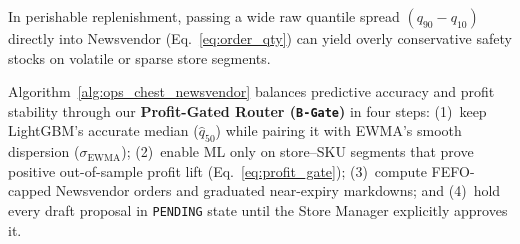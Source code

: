 In perishable replenishment, passing a wide raw quantile spread $(q_{90}-q_{10})$ directly into Newsvendor (Eq.~\ref{eq:order_qty}) can yield overly conservative safety stocks on volatile or sparse store segments.

Algorithm~\ref{alg:ops_chest_newsvendor} balances predictive accuracy and profit stability through our \textbf{Profit-Gated Router (\texttt{B-Gate})} in four steps: (1)~keep LightGBM's accurate median ($\hat{q}_{50}$) while pairing it with EWMA's smooth dispersion ($\sigma_{\text{EWMA}}$); (2)~enable ML only on store--SKU segments that prove positive out-of-sample profit lift (Eq.~\ref{eq:profit_gate}); (3)~compute FEFO-capped Newsvendor orders and graduated near-expiry markdowns; and (4)~hold every draft proposal in \texttt{PENDING} state until the Store Manager explicitly approves it.


